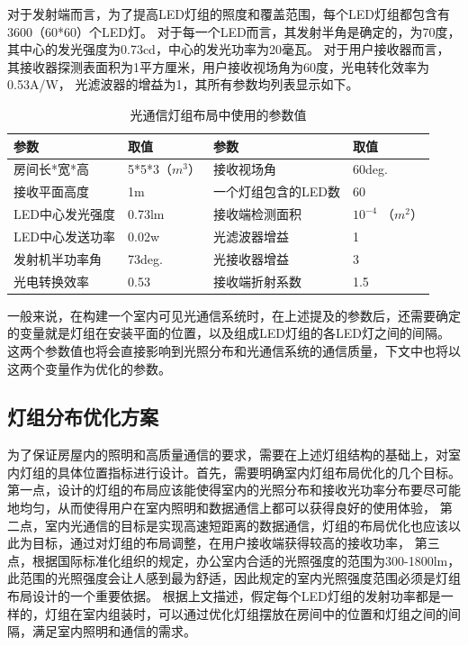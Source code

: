 对于发射端而言，为了提高LED灯组的照度和覆盖范围，每个LED灯组都包含有3600（60*60）个LED灯。
对于每一个LED而言，其发射半角是确定的，为70度，其中心的发光强度为0.73cd，中心的发光功率为20毫瓦。
对于用户接收器而言，其接收器探测表面积为1平方厘米，用户接收视场角为60度，光电转化效率为0.53A/W，
光滤波器的增益为1，其所有参数均列表显示如下。

\begin{table}[htbp]
    \caption{光通信灯组布局中使用的参数值}
    \label{tab:led-layout-param}
    \centering
    \begin{tabular}{llll}
        \toprule
        参数 & 取值 & 参数 & 取值\\
        \midrule
        房间长*宽*高     & 5*5*3（$m^3$） & 接收视场角          & 60deg. \\
        接收平面高度     & 1m           & 一个灯组包含的LED数 & 60 \\
        LED中心发光强度  & 0.73lm       & 接收端检测面积      & $10^{-4}$ （$m^2$） \\
        LED中心发送功率  & 0.02w        & 光滤波器增益        & 1 \\
        发射机半功率角   & 73deg.       & 光接收器增益        & 3 \\
        光电转换效率     & 0.53         & 接收端折射系数      & 1.5 \\
        \bottomrule
    \end{tabular}
\end{table}

一般来说，在构建一个室内可见光通信系统时，在上述提及的参数后，还需要确定的变量就是灯组在安装平面的位置，以及组成LED灯组的各LED灯之间的间隔。
这两个参数值也将会直接影响到光照分布和光通信系统的通信质量，下文中也将以这两个变量作为优化的参数。

\subsection{灯组分布优化方案}\label{sec:led-layout-design}
为了保证房屋内的照明和高质量通信的要求，需要在上述灯组结构的基础上，对室内灯组的具体位置指标进行设计。首先，需要明确室内灯组布局优化的几个目标。
第一点，设计的灯组的布局应该能使得室内的光照分布和接收光功率分布要尽可能地均匀，从而使得用户在室内照明和数据通信上都可以获得良好的使用体验，
第二点，室内光通信的目标是实现高速短距离的数据通信，灯组的布局优化也应该以此为目标，通过对灯组的布局调整，在用户接收端获得较高的接收功率，
第三点，根据国际标准化组织的规定，办公室内合适的光照强度的范围为300-1800lm，此范围的光照强度会让人感到最为舒适，因此规定的室内光照强度范围必须是灯组布局设计的一个重要依据。
根据上文描述，假定每个LED灯组的发射功率都是一样的，灯组在室内组装时，可以通过优化灯组摆放在房间中的位置和灯组之间的间隔，满足室内照明和通信的需求。

